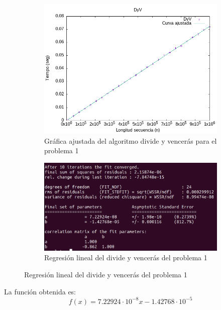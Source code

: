 \documentclass{article}
\begin{document}
\begin{figure}[H]
    \centering
    \begin{subfigure}[b]{0.4\textwidth}
        \centering
        \includegraphics[width=\textwidth]{P1/p1_dyv_ajuste.png}
        \caption{\centering Gráfica ajustada del algoritmo divide y vencerás para el problema 1    }
        \label{fig:p1_dyv_ajuste}
    \end{subfigure}
    \hfill
    \begin{subfigure}[b]{0.5\textwidth}
        \centering
        \includegraphics[width=\textwidth]{P1/p1_dyv_fit.png}
        \caption{\centering Regresión lineal del divide y vencerás del problema 1}
        \label{fig:p1_dyv_fit}
    \end{subfigure}
\end{figure}

La función obtenida es:
\begin{equation*}
    f(x) = 7.22924\cdot10^{-8}x - 1.42768 \cdot10^{-5}
\end{equation*}
\end{document}
